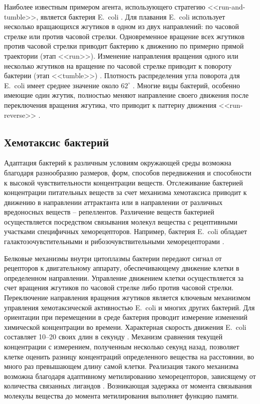 Наиболее известным примером агента, использующего стратегию <<run-and-tumble>>, является бактерия E.~coli \cite{berg_chemotaxis_1972}. Для плавания E.~coli использует несколько вращающихся жгутиков в одном из двух направлений: по часовой стрелке или против часовой стрелки. Одновременное вращение всех жгутиков против часовой стрелки приводит бактерию к движению по примерно прямой траектории (этап <<run>>). Изменение направления вращения одного или несколько жгутиков на вращение по часовой стрелке приводит к повороту бактерии (этап <<tumble>>) \cite{turner_realtime_2000}. Плотность распределения угла поворота для E.~coli имеет среднее значение около $62^\circ$ \cite{berg_chemotaxis_1972}. Многие виды бактерий, особенно имеющие один жгутик, полностью меняют направление своего движения после переключения вращения жгутика, что приводит к паттерну движения <<run-reverse>> \cite{theves_bacterial_2013}.

\subsection{Хемотаксис бактерий}\label{subsec:ch1/sec1/sub3}

Адаптация бактерий к различным условиям окружающей среды возможна благодаря разнообразию размеров, форм, способов передвижения и способности к высокой чувствительности концентрации веществ. Отслеживание бактерией концентрации питательных веществ за счет механизма хемотаксиса приводит к движению в направлении аттрактанта или в направлении от различных вредоносных веществ -- репеллентов. Различение веществ бактерией осуществляется посредством связывания молекул вещества с рецептивными участками специфичных хеморецепторов. Например, бактерия E.~coli обладает галактозочувстительными и рибозочувствительными хеморецепторами \cite{vorotnikov_chemotaxis_2011}.

Белковые механизмы внутри цитоплазмы бактерии передают сигнал от рецепторов к двигательному аппарату, обеспечивающему движение клетки в определенном направлении. Управление движением клетки осуществляется за счет вращения жгутиков по часовой стрелке либо против часовой стрелки. Переключение направления вращения жгутиков является ключевым механизмом управления хемотаксической активностью E.~coli и многих других бактерий. Для ориентации при перемещении в среде бактерия проводит измерение изменений химической концентрации во времени. Характерная скорость движения E.~coli составляет 10--20 своих длин в секунду \cite{milo_cell_2015}. Механизм сравнения текущей концентрации с измерением, полученным несколько секунд назад, позволяет клетке оценить разницу концентраций определенного вещества на расстоянии, во много раз превышающем длину самой клетки. Реализация такого механизма возможна благодаря адаптивному метилированию хеморецепторов, зависящему от количества связанных лигандов \cite{strayer_biohimiya_1984}. Возникающая задержка от момента связывания молекулы вещества до момента метилирования выполняет функцию памяти.

